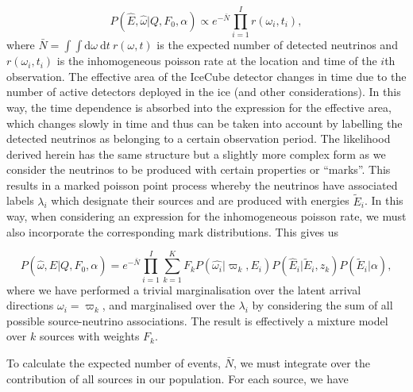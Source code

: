 \documentclass[fontsize=12pt]{article}
\begin{document}
\begin{equation}
P(\hat{E}, \hat{\omega} | Q, F_0, \alpha) \propto e^{-\bar{N}} \prod_{i=1}^{I} r(\omega_i, t_i),
\end{equation}
where $\bar{N} = \int \int \mathrm{d}\omega \ \mathrm{d}t \ r(\omega, t)$ is the expected number of detected neutrinos and $r(\omega_i, t_i)$ is the inhomogeneous poisson rate at the location and time of the $i$th observation. The effective area of the IceCube detector changes in time due to the number of active detectors deployed in the ice (and other considerations). In this way, the time dependence is absorbed into the expression for the effective area, which changes slowly in time and thus can be taken into account by labelling the detected neutrinos as belonging to a certain observation period. The likelihood derived herein has the same structure but a slightly more complex form as we consider the neutrinos to be produced with certain properties or ``marks''. This results in a marked poisson point process whereby the neutrinos have associated labels $\lambda_i$ which designate their sources and are produced with energies $\tilde{E}_i$. In this way, when considering an expression for the inhomogeneous poisson rate, we must also incorporate the corresponding mark distributions. This gives us

\begin{equation}
P(\hat{\omega}, \hat{E} | Q, F_0, \alpha) = e^{-\bar{N}}\prod_{i=1}^I \sum_{k=1}^K F_k P(\hat{\omega_i} | \varpi_k, E_i) P(\hat{E}_i | \tilde{E}_i, z_k) P(\tilde{E}_i | \alpha),
\end{equation}
where we have performed a trivial marginalisation over the latent arrival directions $\omega_i = \varpi_k$, and marginalised over the $\lambda_i$ by considering the sum of all possible source-neutrino associations. The result is effectively a mixture model over $k$ sources with weights $F_k$.

To calculate the expected number of events, $\bar{N}$, we must integrate over the contribution of all sources in our population. For each source, we have 
\end{document}
